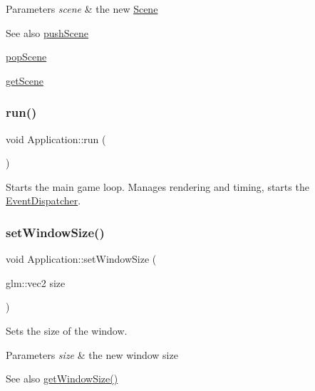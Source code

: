 \begin{DoxyParams}{Parameters}
{\em scene} & the new \mbox{\hyperlink{classsage_1_1Scene}{Scene}} \\
\hline
\end{DoxyParams}
\begin{DoxySeeAlso}{See also}
\mbox{\hyperlink{classsage_1_1Application_ad69ba03dafa5afd69f2d6eb2a9d5fad5}{push\+Scene}} 

\mbox{\hyperlink{classsage_1_1Application_a47b5bec61b3d93cbb4998b42d0d2ea47}{pop\+Scene}} 

\mbox{\hyperlink{classsage_1_1Application_a4eaac489d4247bd184e17fa0aa6c858c}{get\+Scene}} 
\end{DoxySeeAlso}
\mbox{\label{classsage_1_1Application_a68965449404743bf1add056784d6cf81}} 
\subsubsection{\texorpdfstring{run()}{run()}}
{\footnotesize\ttfamily void Application\+::run (\begin{DoxyParamCaption}{ }\end{DoxyParamCaption})}



Starts the main game loop. Manages rendering and timing, starts the \mbox{\hyperlink{classsage_1_1EventDispatcher}{Event\+Dispatcher}}. 

\mbox{\label{classsage_1_1Application_a991df90e69398b7fe8eeb0fa2df3d92e}} 
\subsubsection{\texorpdfstring{setWindowSize()}{setWindowSize()}}
{\footnotesize\ttfamily void Application\+::set\+Window\+Size (\begin{DoxyParamCaption}\item[{glm\+::vec2}]{size }\end{DoxyParamCaption})}



Sets the size of the window. 


\begin{DoxyParams}{Parameters}
{\em size} & the new window size \\
\hline
\end{DoxyParams}
\begin{DoxySeeAlso}{See also}
\mbox{\hyperlink{classsage_1_1Application_ac0fa1750ee8dcacc37cc9eaed72f12f9}{get\+Window\+Size()}} 
\end{DoxySeeAlso}


